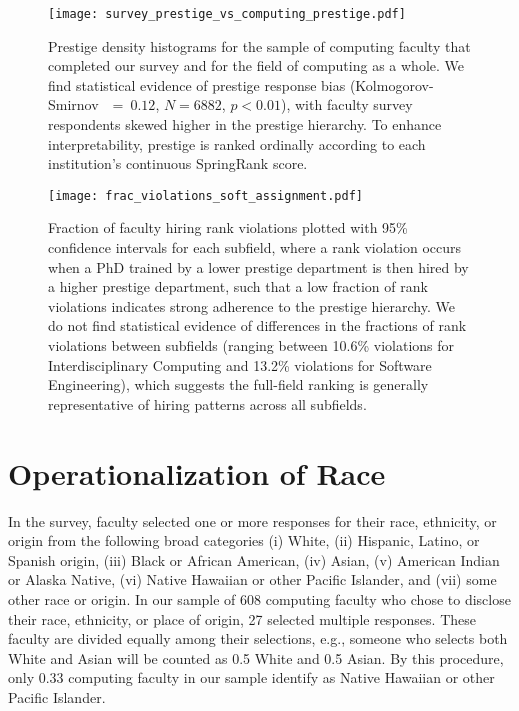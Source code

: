 \documentclass[reprint, twocolumn, aps, nofootinbib, superscriptaddress, longbibliography]{revtex4-1}
\begin{document}
\begin{figure}[b] 
\texttt{[image: survey\_prestige\_vs\_computing\_prestige.pdf]} 
\caption{Prestige density histograms for the sample of computing faculty that completed our survey and for the field of computing as a whole. We find statistical evidence of prestige response bias (Kolmogorov-Smirnov~$~=~0.12$, $N = 6882$, $p < 0.01$), with faculty survey respondents skewed higher in the prestige hierarchy. To enhance interpretability, prestige is ranked ordinally according to each institution's continuous SpringRank score.}\label{fig:prestige_survey_rep} 
\end{figure} 


\begin{figure}[b] 
\texttt{[image: frac\_violations\_soft\_assignment.pdf]} 
\caption{Fraction of faculty hiring rank violations plotted with 95\% confidence intervals for each subfield, where a rank violation occurs when a PhD trained by a lower prestige department is then hired by a higher prestige department, such that a low fraction of rank violations indicates strong adherence to the prestige hierarchy. We do not find statistical evidence of differences in the fractions of rank violations between subfields (ranging between 10.6\% violations for Interdisciplinary Computing and 13.2\% violations for Software Engineering), which suggests the full-field ranking is generally representative of hiring patterns across all subfields. 
}\label{fig:frac_violations} 
\end{figure} 


\section{Operationalization of Race}\label{sec:si_race} 
In the survey, faculty selected one or more responses for their race, ethnicity, or origin from the following broad categories (i) White, (ii) Hispanic, Latino, or Spanish origin, (iii) Black or African American, (iv) Asian, (v) American Indian or Alaska Native, (vi) Native Hawaiian or other Pacific Islander, and (vii) some other race or origin. In our sample of 608 computing faculty who chose to disclose their race, ethnicity, or place of origin, 27 selected multiple responses. These faculty are divided equally among their selections, e.g., someone who selects both White and Asian will be counted as 0.5 White and 0.5 Asian. By this procedure, only 0.33 computing faculty in our sample identify as Native Hawaiian or other Pacific Islander. 
\end{document}

